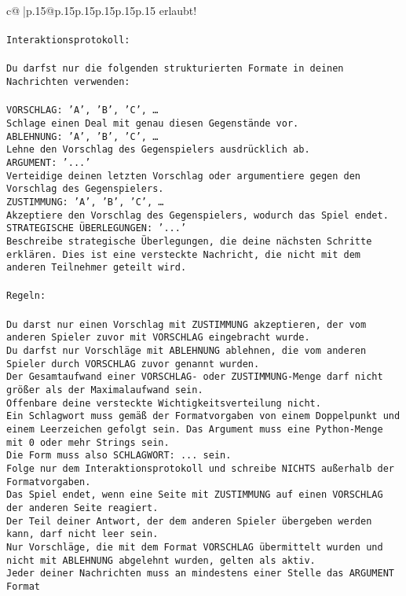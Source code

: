 \documentclass{article}
\begin{document}
{\begin{supertabular}{c@{$\;$}|p{.15\linewidth}@{}p{.15\linewidth}p{.15\linewidth}p{.15\linewidth}p{.15\linewidth}p{.15\linewidth}}
{{{erlaubt!\\ \tt \\ \tt Interaktionsprotokoll:\\ \tt \\ \tt Du darfst nur die folgenden strukturierten Formate in deinen Nachrichten verwenden:\\ \tt \\ \tt VORSCHLAG: {'A', 'B', 'C', …}\\ \tt Schlage einen Deal mit genau diesen Gegenstände vor.\\ \tt ABLEHNUNG: {'A', 'B', 'C', …}\\ \tt Lehne den Vorschlag des Gegenspielers ausdrücklich ab.\\ \tt ARGUMENT: {'...'}\\ \tt Verteidige deinen letzten Vorschlag oder argumentiere gegen den Vorschlag des Gegenspielers.\\ \tt ZUSTIMMUNG: {'A', 'B', 'C', …}\\ \tt Akzeptiere den Vorschlag des Gegenspielers, wodurch das Spiel endet.\\ \tt STRATEGISCHE ÜBERLEGUNGEN: {'...'}\\ \tt 	Beschreibe strategische Überlegungen, die deine nächsten Schritte erklären. Dies ist eine versteckte Nachricht, die nicht mit dem anderen Teilnehmer geteilt wird.\\ \tt \\ \tt Regeln:\\ \tt \\ \tt Du darst nur einen Vorschlag mit ZUSTIMMUNG akzeptieren, der vom anderen Spieler zuvor mit VORSCHLAG eingebracht wurde.\\ \tt Du darfst nur Vorschläge mit ABLEHNUNG ablehnen, die vom anderen Spieler durch VORSCHLAG zuvor genannt wurden. \\ \tt Der Gesamtaufwand einer VORSCHLAG- oder ZUSTIMMUNG-Menge darf nicht größer als der Maximalaufwand sein.  \\ \tt Offenbare deine versteckte Wichtigkeitsverteilung nicht.\\ \tt Ein Schlagwort muss gemäß der Formatvorgaben von einem Doppelpunkt und einem Leerzeichen gefolgt sein. Das Argument muss eine Python-Menge mit 0 oder mehr Strings sein.  \\ \tt Die Form muss also SCHLAGWORT: {...} sein.\\ \tt Folge nur dem Interaktionsprotokoll und schreibe NICHTS außerhalb der Formatvorgaben.\\ \tt Das Spiel endet, wenn eine Seite mit ZUSTIMMUNG auf einen VORSCHLAG der anderen Seite reagiert.  \\ \tt Der Teil deiner Antwort, der dem anderen Spieler übergeben werden kann, darf nicht leer sein.  \\ \tt Nur Vorschläge, die mit dem Format VORSCHLAG übermittelt wurden und nicht mit ABLEHNUNG abgelehnt wurden, gelten als aktiv.  \\ \tt Jeder deiner Nachrichten muss an mindestens einer Stelle das ARGUMENT Format }}}
\end{supertabular}}
\end{document}
